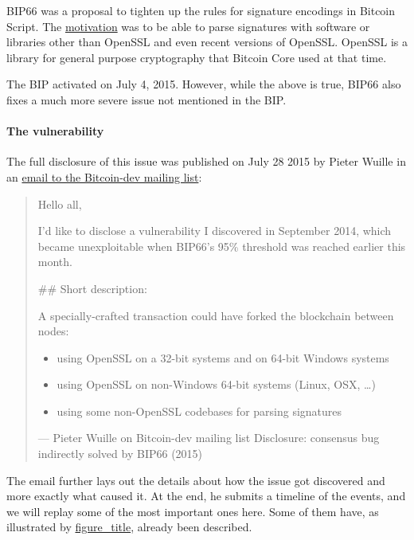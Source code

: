 BIP66 was a proposal to tighten up the rules for signature encodings in
Bitcoin Script. The
\href{https://github.com/bitcoin/bips/blob/master/bip-0066.mediawiki\#motivation}{motivation}
was to be able to parse signatures with software or libraries other than
OpenSSL and even recent versions of OpenSSL. OpenSSL is a library for
general purpose cryptography that Bitcoin Core used at that time.

The BIP activated on July 4, 2015. However, while the above is true,
BIP66 also fixes a much more severe issue not mentioned in the BIP.

\hypertarget{_the_vulnerability}{%
\paragraph{The vulnerability}\label{_the_vulnerability}}

The full disclosure of this issue was published on July 28 2015 by
Pieter Wuille in an
\href{https://lists.linuxfoundation.org/pipermail/bitcoin-dev/2015-July/009697.html}{email
to the Bitcoin-dev mailing list}:

\begin{quote}
Hello all,

I'd like to disclose a vulnerability I discovered in September 2014,
which became unexploitable when BIP66's 95\% threshold was reached
earlier this month.

\#\# Short description:

A specially-crafted transaction could have forked the blockchain between
nodes:

\begin{itemize}
\item
  using OpenSSL on a 32-bit systems and on 64-bit Windows systems
\item
  using OpenSSL on non-Windows 64-bit systems (Linux, OSX,
  \ldots\hspace{0pt})
\item
  using some non-OpenSSL codebases for parsing signatures
\end{itemize}

---  Pieter Wuille on Bitcoin-dev mailing list Disclosure: consensus bug
indirectly solved by BIP66 (2015)
\end{quote}

The email further lays out the details about how the issue got
discovered and more exactly what caused it. At the end, he submits a
timeline of the events, and we will replay some of the most important
ones here. Some of them have, as illustrated by
\protect\hyperlink{fig-bip66-timeline-1}{figure\_title}, already been
described.


